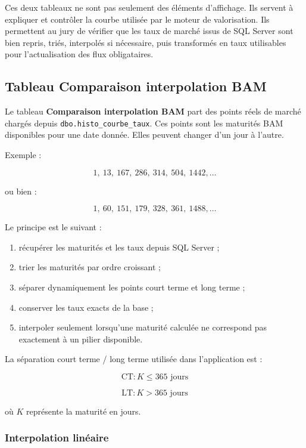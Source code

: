 \documentclass[12pt,a4paper]{article}
\begin{document}
Ces deux tableaux ne sont pas seulement des éléments d'affichage. Ils servent à expliquer et contrôler la courbe utilisée par le moteur de valorisation. Ils permettent au jury de vérifier que les taux de marché issus de SQL Server sont bien repris, triés, interpolés si nécessaire, puis transformés en taux utilisables pour l'actualisation des flux obligataires.

\subsection{Tableau Comparaison interpolation BAM}

Le tableau \textbf{Comparaison interpolation BAM} part des points réels de marché chargés depuis \texttt{dbo.histo\_courbe\_taux}. Ces points sont les maturités BAM disponibles pour une date donnée. Elles peuvent changer d'un jour à l'autre.

Exemple :

\[
1,\ 13,\ 167,\ 286,\ 314,\ 504,\ 1442,\ldots
\]

ou bien :

\[
1,\ 60,\ 151,\ 179,\ 328,\ 361,\ 1488,\ldots
\]

Le principe est le suivant :

\begin{enumerate}
    \item récupérer les maturités et les taux depuis SQL Server ;
    \item trier les maturités par ordre croissant ;
    \item séparer dynamiquement les points court terme et long terme ;
    \item conserver les taux exacts de la base ;
    \item interpoler seulement lorsqu'une maturité calculée ne correspond pas exactement à un pilier disponible.
\end{enumerate}

La séparation court terme / long terme utilisée dans l'application est :

\[
\text{CT} : K \leq 365 \text{ jours}
\]

\[
\text{LT} : K > 365 \text{ jours}
\]

où $K$ représente la maturité en jours.

\subsubsection*{Interpolation linéaire}
\end{document}
